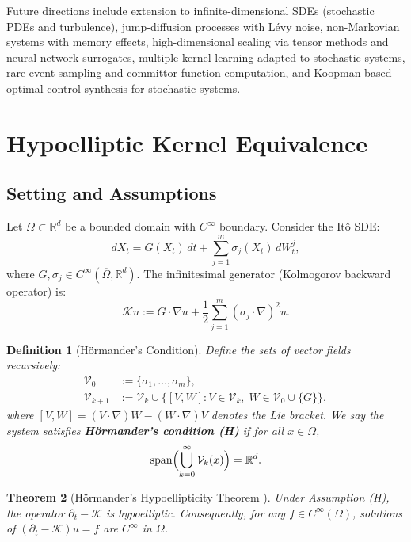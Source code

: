 \documentclass[11pt,a4paper]{article}
\newtheorem{theorem}{Theorem}[section]
\newtheorem{definition}[theorem]{Definition}
\begin{document}
Future directions include extension to infinite-dimensional SDEs (stochastic PDEs and turbulence), jump-diffusion processes with L\'{e}vy noise, non-Markovian systems with memory effects, high-dimensional scaling via tensor methods and neural network surrogates, multiple kernel learning adapted to stochastic systems, rare event sampling and committor function computation, and Koopman-based optimal control synthesis for stochastic systems.

\appendix 

\section{Hypoelliptic Kernel Equivalence}

\subsection{Setting and Assumptions}
Let $\Omega \subset \mathbb{R}^d$ be a bounded domain with $C^\infty$ boundary. Consider the It\^{o} SDE:
\[
dX_t = G(X_t)\,dt + \sum_{j=1}^m \sigma_j(X_t)\,dW_t^j,
\]
where $G, \sigma_j \in C^\infty(\overline{\Omega}, \mathbb{R}^d)$. The infinitesimal generator (Kolmogorov backward operator) is:
\[
\mathcal{K} u := G \cdot \nabla u + \frac{1}{2} \sum_{j=1}^m (\sigma_j \cdot \nabla)^2 u.
\]

\begin{definition}[H\"{o}rmander's Condition]
Define the sets of vector fields recursively:
\[
\begin{aligned}
\mathcal{V}_0 &:= \{\sigma_1, \dots, \sigma_m\}, \\
\mathcal{V}_{k+1} &:= \mathcal{V}_k \cup \{[V, W] : V \in \mathcal{V}_k,\; W \in \mathcal{V}_0 \cup \{G\}\},
\end{aligned}
\]
where $[V,W] = (V\cdot\nabla)W - (W\cdot\nabla)V$ denotes the Lie bracket. We say the system satisfies \textbf{H\"{o}rmander's condition (H)} if for all $x \in \Omega$,
\[
\operatorname{span}\Bigl(\bigcup_{k=0}^\infty \mathcal{V}_k(x)\Bigr) = \mathbb{R}^d.
\]
\end{definition}

\begin{theorem}[H\"{o}rmander's Hypoellipticity Theorem \cite{Hormander1967}]
Under Assumption (H), the operator $\partial_t - \mathcal{K}$ is hypoelliptic. Consequently, for any $f \in C^\infty(\Omega)$, solutions of $(\partial_t - \mathcal{K})u = f$ are $C^\infty$ in $\Omega$.
\end{theorem}
\end{document}
